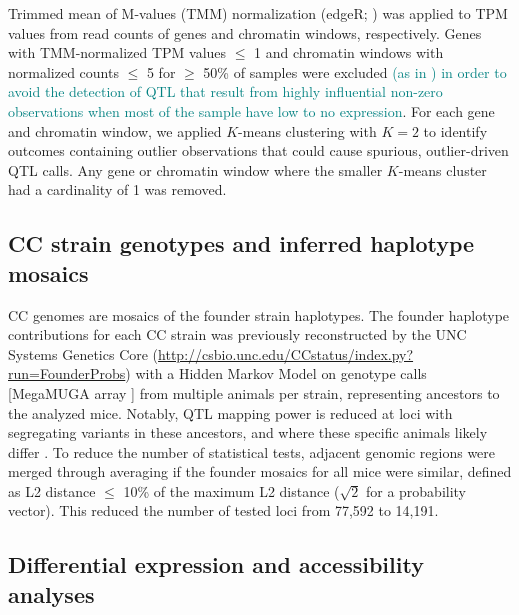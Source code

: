 \documentclass[10pt,letterpaper]{article}
\newcommand{\GKinline}[1]{\textcolor{teal}{#1}}
\begin{document}
Trimmed mean of M-values (TMM) normalization (edgeR; \cite{edgeR}) was applied to TPM values from read counts of genes and chromatin windows, respectively. Genes with TMM-normalized TPM values $\leq$ 1 and chromatin windows with normalized counts $\leq$ 5 for $\geq$ 50\% of samples were excluded \GKinline{(as in \cite{Chick2016}) in order to avoid the detection of QTL that result from highly influential non-zero observations when most of the sample have low to no expression}. For each gene and chromatin window, we applied $K$-means clustering with $K=2$ to identify outcomes containing outlier observations that could cause spurious, outlier-driven QTL calls. Any gene or chromatin window where the smaller $K$-means cluster had a cardinality of 1 was removed.

\subsection*{CC strain genotypes and inferred haplotype mosaics}

CC genomes are mosaics of the founder strain haplotypes. The founder haplotype contributions for each CC strain was previously reconstructed by the UNC Systems Genetics Core (\url{http://csbio.unc.edu/CCstatus/index.py?run=FounderProbs}) with a Hidden Markov Model \cite{Fu2012} on genotype calls [MegaMUGA array \cite{Morgan2016muga}] from multiple animals per strain, representing ancestors to the analyzed mice. Notably, QTL mapping power is reduced at loci with segregating variants in these ancestors, and where these specific animals likely differ \cite{Shorter2019}. To reduce the number of statistical tests, adjacent genomic regions were merged through averaging if the founder mosaics for all mice were similar, defined as L2 distance $\leq$ 10\% of the maximum L2 distance ($\sqrt{2}$ for a probability vector). This reduced the number of tested loci from 77,592 to 14,191.

\subsection*{Differential expression and accessibility analyses}
\end{document}
